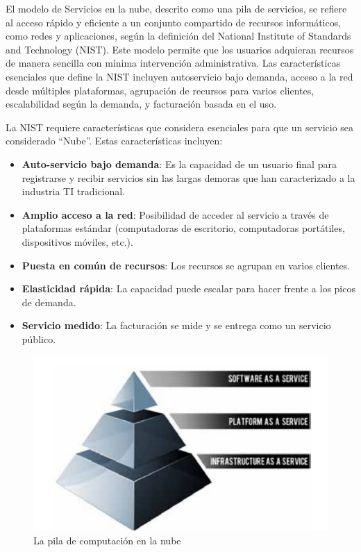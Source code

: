 \documentclass{article}
\begin{document}
El modelo de Servicios en la nube, descrito como una pila de servicios, se refiere al acceso rápido y eficiente a un conjunto compartido de recursos informáticos, como redes y aplicaciones, según la definición del National Institute of Standards and Technology (NIST). Este modelo permite que los usuarios adquieran recursos de manera sencilla con mínima intervención administrativa. Las características esenciales que define la NIST incluyen autoservicio bajo demanda, acceso a la red desde múltiples plataformas, agrupación de recursos para varios clientes, escalabilidad según la demanda, y facturación basada en el uso.

La NIST requiere características que considera esenciales para que un servicio sea considerado
“Nube”. Estas características incluyen:

\begin{itemize}
    \item \textbf{Auto-servicio bajo demanda}: Es la capacidad de un usuario final para registrarse y recibir servicios sin las largas demoras que han caracterizado a la industria TI tradicional.
    \item \textbf{Amplio acceso a la red}: Posibilidad de acceder al servicio a través de plataformas estándar (computadoras de escritorio, computadoras portátiles, dispositivos móviles, etc.).
    \item \textbf{Puesta en común de recursos}: Los recursos se agrupan en varios clientes.
    \item \textbf{Elasticidad rápida}: La capacidad puede escalar para hacer frente a los picos de demanda.
    \item \textbf{Servicio medido}: La facturación se mide y se entrega como un servicio público.
\end{itemize}

\begin{figure}
\centering
\includegraphics[width=0.65\linewidth]{Captura de pantalla 2024-10-18 211038.png}
\caption{\label{fig:cloud_computing} La pila de computación en la nube}
\end{figure}
\end{document}
